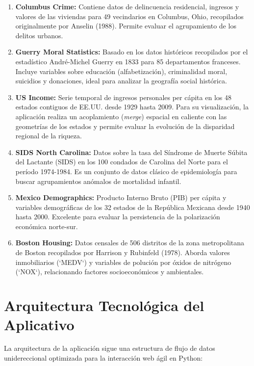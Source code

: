 \documentclass[a4paper,12pt]{article}
\begin{document}
\begin{enumerate}
    \item \textbf{Columbus Crime:} Contiene datos de delincuencia residencial, ingresos y valores de las viviendas para 49 vecindarios en Columbus, Ohio, recopilados originalmente por Anselin (1988). Permite evaluar el agrupamiento de los delitos urbanos.
    \item \textbf{Guerry Moral Statistics:} Basado en los datos históricos recopilados por el estadístico André-Michel Guerry en 1833 para 85 departamentos franceses. Incluye variables sobre educación (alfabetización), criminalidad moral, suicidios y donaciones, ideal para analizar la geografía social histórica.
    \item \textbf{US Income:} Serie temporal de ingresos personales per cápita en los 48 estados contiguos de EE.UU. desde 1929 hasta 2009. Para su visualización, la aplicación realiza un acoplamiento (\textit{merge}) espacial en caliente con las geometrías de los estados y permite evaluar la evolución de la disparidad regional de la riqueza.
    \item \textbf{SIDS North Carolina:} Datos sobre la tasa del Síndrome de Muerte Súbita del Lactante (SIDS) en los 100 condados de Carolina del Norte para el período 1974-1984. Es un conjunto de datos clásico de epidemiología para buscar agrupamientos anómalos de mortalidad infantil.
    \item \textbf{Mexico Demographics:} Producto Interno Bruto (PIB) per cápita y variables demográficas de los 32 estados de la República Mexicana desde 1940 hasta 2000. Excelente para evaluar la persistencia de la polarización económica norte-sur.
    \item \textbf{Boston Housing:} Datos censales de 506 distritos de la zona metropolitana de Boston recopilados por Harrison y Rubinfeld (1978). Aborda valores inmobiliarios (`MEDV`) y variables de polución por óxidos de nitrógeno (`NOX`), relacionando factores socioeconómicos y ambientales.
\end{enumerate}

\section{Arquitectura Tecnológica del Aplicativo}
La arquitectura de la aplicación sigue una estructura de flujo de datos unidereccional optimizada para la interacción web ágil en Python:
\end{document}
